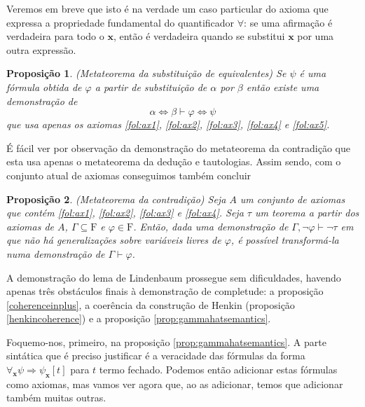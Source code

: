 \documentclass{report}
\newtheorem{prop}{Proposição}
\theoremstyle{definition}
\theoremstyle{remark}
\renewcommand{\bf}[1]{\mathbf{#1}}
\newcommand{\F}{\mathrm{F}}
\newcommand{\imply}{\mathbin{\Rightarrow}}
\newcommand{\eqv}{\mathbin{\Leftrightarrow}}
\begin{document}
	Veremos em breve que isto é na verdade um caso particular do axioma que expressa a propriedade fundamental do quantificador $\forall$: se uma afirmação é verdadeira para todo o $\bf x$, então é verdadeira quando se substitui $\bf x$ por uma outra expressão.

	\begin{prop} (Metateorema da substituição de equivalentes)
	Se $\psi$ é uma fórmula obtida de $\varphi$ a partir de substituição de $\alpha$ por $\beta$ então existe uma demonstração de
	\[\alpha \eqv \beta \vdash \varphi \eqv \psi\]
	que usa apenas os axiomas \eqref{fol:ax1}, \eqref{fol:ax2}, \eqref{fol:ax3}, \eqref{fol:ax4} e \eqref{fol:ax5}.
	\end{prop}

	É fácil ver por observação da demonstração do metateorema da contradição que esta usa apenas o metateorema da dedução e tautologias. Assim sendo, com o conjunto atual de axiomas conseguimos também concluir

	\begin{prop} (Metateorema da contradição)
	Seja $A$ um conjunto de axiomas que contém \eqref{fol:ax1}, \eqref{fol:ax2}, \eqref{fol:ax3} e \eqref{fol:ax4}. Seja $\tau$ um teorema a partir dos axiomas de $A$, $\Gamma \subseteq \F$ e $\varphi \in \F$. Então, dada uma demonstração de $\Gamma, \neg \varphi \vdash \neg \tau$ em que não há generalizações sobre variáveis livres de $\varphi$, é possível transformá-la numa demonstração de $\Gamma \vdash \varphi$.
	\end{prop}

	A demonstração do lema de Lindenbaum prossegue sem dificuldades, havendo apenas três obstáculos finais à demonstração de completude: a proposição \ref{coherenceinplus}, a coerência da construção de Henkin (proposição \ref{henkincoherence}) e a proposição \ref{prop:gammahatsemantics}.

	Foquemo-nos, primeiro, na proposição \ref{prop:gammahatsemantics}. A parte sintática que é preciso justificar é a veracidade das fórmulas da forma $\forall_{\bf x} \psi \imply \psi_{\bf x}[t]$ para $t$ termo fechado. Podemos então adicionar estas fórmulas como axiomas, mas vamos ver agora que, ao as adicionar, temos que adicionar também muitas outras.
\end{document}
